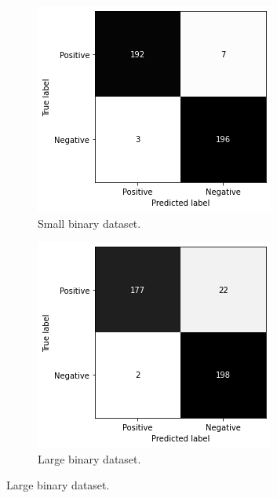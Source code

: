 \begin{figure}
    \centering
    \begin{subfigure}[b]{0.49\textwidth}
        \centering
        \includegraphics[width=\textwidth]{figures/cm-no-improv-s-b.png}
        \caption{Small binary dataset.}
        \label{fig:cm-n-improv-s-b}
    \end{subfigure}
    \hfill
    \begin{subfigure}[b]{0.49\textwidth}
        \centering
        \includegraphics[width=\textwidth]{figures/cm-no-improv-l-b.png}
        \caption{Large binary dataset.}
        \label{fig:cm-n-improv-l-b}
    \end{subfigure}
    \vspace{10mm} %
    

\end{figure}
